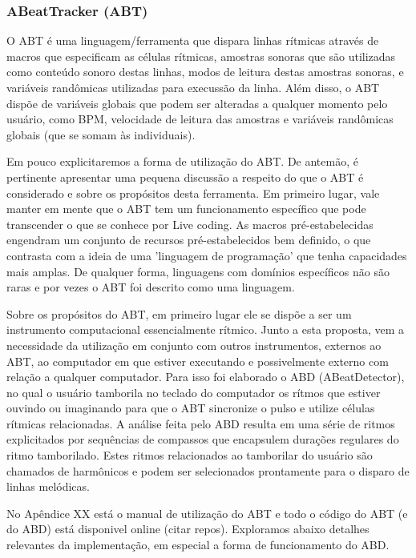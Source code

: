 \subsubsection{ABeatTracker (ABT)}

O ABT é uma linguagem/ferramenta que dispara linhas rítmicas através
de macros que especificam as células rítmicas, amostras sonoras que
são utilizadas como conteúdo sonoro destas linhas, modos de leitura
destas amostras sonoras, e variáveis randômicas utilizadas para
execussão da linha. Além disso, o ABT dispõe de variáveis globais que
podem ser alteradas a qualquer momento pelo usuário, como BPM,
velocidade de leitura das amostras e variáveis randômicas globais (que
se somam às individuais).

Em pouco explicitaremos a forma de utilização do ABT. De antemão, é
pertinente apresentar uma pequena discussão a respeito do que o ABT é
considerado e sobre os propósitos desta ferramenta. Em primeiro lugar,
vale manter em mente que o ABT tem um funcionamento específico que
pode transcender o que se conhece por Live coding. As macros
pré-estabelecidas engendram um conjunto de recursos pré-estabelecidos
bem definido, o que contrasta com a ideia de uma 'linguagem de
programação' que tenha capacidades mais amplas. De qualquer forma,
linguagens com domínios específicos não são raras e por vezes o ABT
foi descrito como uma linguagem.

Sobre os propósitos do ABT, em primeiro lugar ele se dispõe a ser um
instrumento computacional essencialmente rítmico. Junto a esta
proposta, vem a necessidade da utilização em conjunto com outros
instrumentos, externos ao ABT, ao computador em que estiver executando
e possivelmente externo com relação a qualquer computador. Para isso
foi elaborado o ABD (ABeatDetector), no qual o usuário tamborila no
teclado do computador os rítmos que estiver ouvindo ou imaginando para
que o ABT sincronize o pulso e utilize células rítmicas
relacionadas. A análise feita pelo ABD resulta em uma série de ritmos
explicitados por sequências de compassos que encapsulem durações
regulares do ritmo tamborilado. Estes ritmos relacionados ao
tamborilar do usuário são chamados de harmônicos e podem ser
selecionados prontamente para o disparo de linhas melódicas.

No Apêndice XX está o manual de utilização do ABT e todo o código do
ABT (e do ABD) está disponivel online (citar repos). Exploramos abaixo
detalhes relevantes da implementação, em especial a forma de
funcionamento do ABD.

